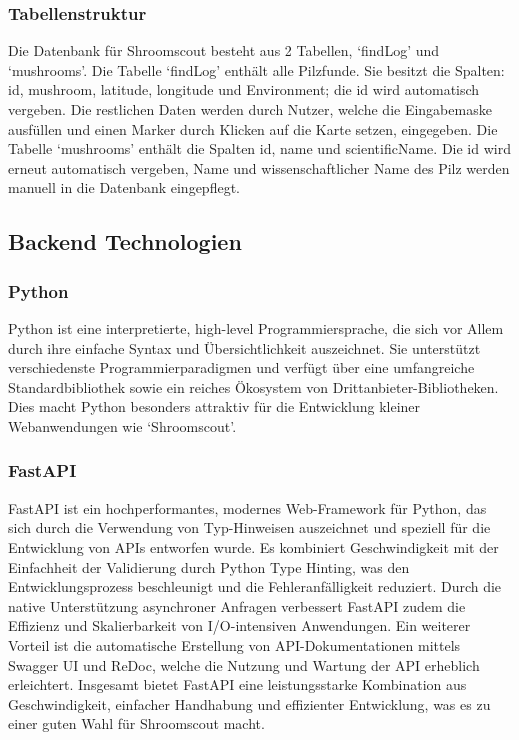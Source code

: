 \subsubsection{Tabellenstruktur}

Die Datenbank für Shroomscout besteht aus 2 Tabellen, `findLog' und `mushrooms'. Die Tabelle `findLog' enthält alle Pilzfunde. Sie besitzt die Spalten: id, mushroom,
latitude, longitude und Environment; die id wird automatisch vergeben. Die restlichen Daten werden durch Nutzer, welche die Eingabemaske ausfüllen und einen Marker
durch Klicken auf die Karte setzen, eingegeben. Die Tabelle `mushrooms' enthält die Spalten id, name und scientificName. Die id wird erneut automatisch vergeben, Name
und wissenschaftlicher Name des Pilz werden manuell in die Datenbank eingepflegt.

\subsection{Backend Technologien}

\subsubsection{Python}

Python ist eine interpretierte, high-level Programmiersprache, die sich vor Allem durch ihre einfache Syntax und Übersichtlichkeit auszeichnet. Sie unterstützt
verschiedenste Programmierparadigmen und verfügt über eine umfangreiche Standardbibliothek sowie ein reiches Ökosystem von Drittanbieter-Bibliotheken. Dies macht
Python besonders attraktiv für die Entwicklung kleiner Webanwendungen wie `Shroomscout'.

\subsubsection*{FastAPI}

FastAPI ist ein hochperformantes, modernes Web-Framework für Python, das sich durch die Verwendung von Typ-Hinweisen auszeichnet und speziell für die Entwicklung
von APIs entworfen wurde. Es kombiniert Geschwindigkeit mit der Einfachheit der Validierung durch Python Type Hinting, was den Entwicklungsprozess beschleunigt und
die Fehleranfälligkeit reduziert. Durch die native Unterstützung asynchroner Anfragen verbessert FastAPI zudem die Effizienz und Skalierbarkeit von I/O-intensiven
Anwendungen. Ein weiterer Vorteil ist die automatische Erstellung von API-Dokumentationen mittels Swagger UI und ReDoc, welche die Nutzung und Wartung der API erheblich
erleichtert. Insgesamt bietet FastAPI eine leistungsstarke Kombination aus Geschwindigkeit, einfacher Handhabung und effizienter Entwicklung, was es zu einer guten Wahl
für Shroomscout macht.

